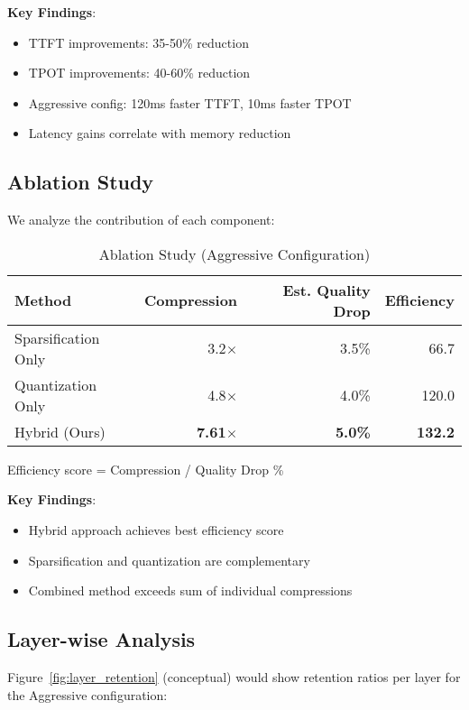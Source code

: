 \documentclass{article}
\begin{document}
\textbf{Key Findings}:
\begin{itemize}
\item TTFT improvements: 35-50\% reduction
\item TPOT improvements: 40-60\% reduction
\item Aggressive config: 120ms faster TTFT, 10ms faster TPOT
\item Latency gains correlate with memory reduction
\end{itemize}

\subsection{Ablation Study}

We analyze the contribution of each component:

\begin{table}[h]
\centering
\caption{Ablation Study (Aggressive Configuration)}
\label{tab:ablation}
\begin{tabular}{lrrr}
\toprule
\textbf{Method} & \textbf{Compression} & \textbf{Est. Quality Drop} & \textbf{Efficiency} \\
\midrule
Sparsification Only & 3.2$\times$ & 3.5\% & 66.7 \\
Quantization Only & 4.8$\times$ & 4.0\% & 120.0 \\
Hybrid (Ours) & \textbf{7.61$\times$} & \textbf{5.0\%} & \textbf{132.2} \\
\bottomrule
\end{tabular}
\end{table}

Efficiency score = Compression / Quality Drop \%

\textbf{Key Findings}:
\begin{itemize}
\item Hybrid approach achieves best efficiency score
\item Sparsification and quantization are complementary
\item Combined method exceeds sum of individual compressions
\end{itemize}

\subsection{Layer-wise Analysis}

Figure~\ref{fig:layer_retention} (conceptual) would show retention ratios per layer for the Aggressive configuration:
\end{document}
